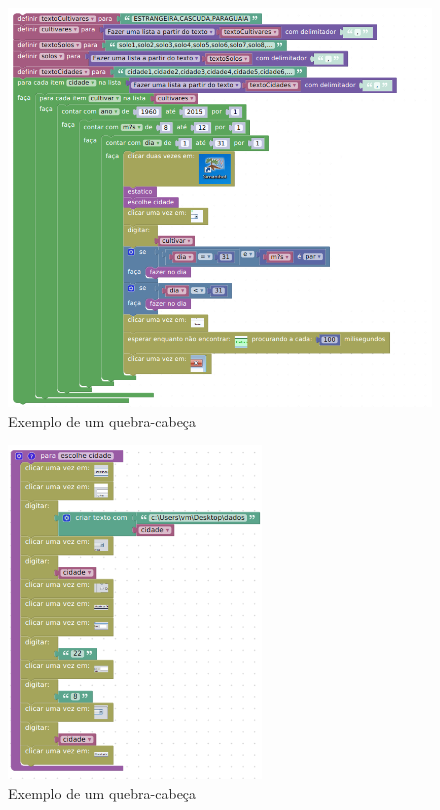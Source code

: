 \documentclass[tg]{mdtufsm}
\begin{document}
                    \begin{figure}[!htb]
                        {\centering
                        \includegraphics[width=1.0\textwidth]{imagens/coreSimani.png}
                        \caption{Exemplo de um quebra-cabeça}
                        \label{fig:coreSimani}}
                    \end{figure}

                    \begin{figure}[!htb]
                        {\centering
                        \includegraphics[width=0.6\textwidth]{imagens/EscolheCidade.png}
                        \caption{Exemplo de um quebra-cabeça}
                        \label{fig:EscolheCidade}}
                    \end{figure}
\end{document}
